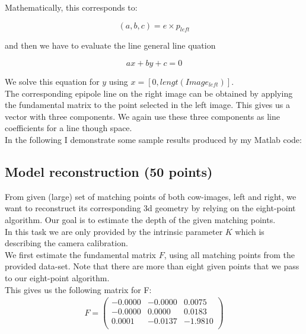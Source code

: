 \documentclass{paper}
\begin{document}
Mathematically, this corresponds to:

\begin{equation}
    (a,b,c) = e \times p_{left}
\end{equation}

and then we have to evaluate the line general line quation 

\begin{equation}
    ax + by + c = 0
\end{equation}

We solve this equation for $y$ using $x = [0,lengt(Image_{left})]$. \\

The corresponding epipole line on the right image can be obtained by applying the fundamental matrix to the point selected in the left image. This gives us a vector with three components. We again use these three components as line coefficients for a line though space. \\

In the following I demonstrate some sample results produced by my Matlab code:






 




\subsection{Model reconstruction (50 points)}

From given (large) set of matching points of both cow-images, left and right, we want to reconstruct its corresponding 3d geometry by relying on the eight-point algorithm. Our goal is to estimate the depth of the given matching points. \\

In this task we are only provided by the intrinsic parameter $K$ which is describing the camera calibration. \\

We first estimate the fundamental matrix $F$, using all matching points from the provided data-set. Note that there are more than eight given points that we pass to our eight-point algorithm. \\

This gives us the following matrix for F:
\begin{align}
F = 
\left(\begin{array}{rrr}
   -0.0000  & -0.0000 &   0.0075 \\
   -0.0000  &  0.0000 &   0.0183 \\
    0.0001  & -0.0137 &  -1.9810 \\
\end{array} \right)
\end{align}
\end{document}
